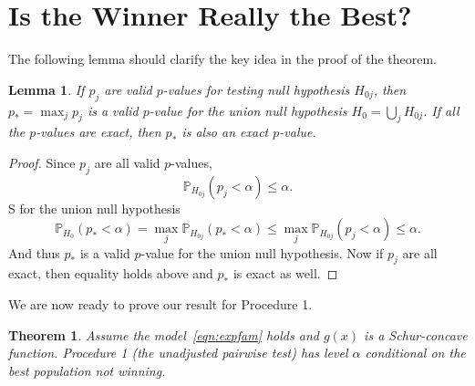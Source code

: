 \documentclass[11pt]{article}
\newtheorem{lemma}[corollary]{Lemma}
\newtheorem{theorem}[corollary]{Theorem}
\newcommand{\PP}{\mathbb{P}}
\begin{document}
\section{Is the Winner Really the Best?}
\label{sec:winnerbest}

The following lemma should clarify the key idea in the proof of the theorem.

\begin{lemma}
If $p_j$ are valid $p$-values for testing null hypothesis $H_{0j}$, then $p_* = \max_j p_j$ is a valid $p$-value for the union null hypothesis $H_0 = \bigcup_j H_{0j}$. If all the $p$-values are exact, then $p_*$ is also an exact $p$-value.
\label{lma:union}
\end{lemma}

\begin{proof}
Since $p_j$ are all valid $p$-values,
$$\PP_{H_{0j}}\left(p_j < \alpha\right) \le \alpha.$$
S for the union null hypothesis
$$\PP_{H_0}\left(p_* < \alpha\right) = \max_j \PP_{H_{0j}}\left(p_* < \alpha\right) \le \max_j \PP_{H_{0j}}\left(p_j < \alpha\right) \le \alpha.$$
And thus $p_*$ is a valid $p$-value for the union null hypothesis. Now if $p_j$ are all exact, then equality holds above and $p_*$ is exact as well.
\end{proof}

We are now ready to prove our result for Procedure 1.

\begin{theorem}
Assume the model~\eqref{eqn:expfam} holds and $g\left(x\right)$ is a Schur-concave function. Procedure 1 (the unadjusted pairwise test) has level $\alpha$ conditional on the best population not winning.
\label{thm:seltest}
\end{theorem}
\end{document}
